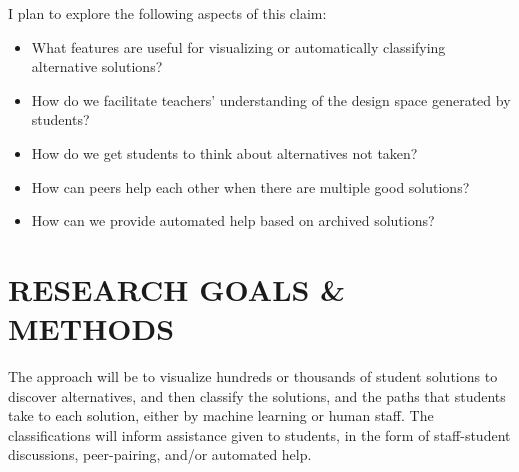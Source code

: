 \documentclass[12pt]{article}
\begin{document}
I plan to explore the following aspects of this claim:
\begin{itemize}

\item What features are useful for visualizing or automatically classifying alternative solutions?

\item How do we facilitate teachers' understanding of the design space generated by students?

\item How do we get students to think about alternatives not taken?

\item How can peers help each other when there are multiple good solutions?

\item How can we provide automated help based on archived solutions?

\end{itemize}


\section{RESEARCH GOALS \& METHODS}

The approach will be to visualize hundreds or thousands of student solutions to discover alternatives, and then classify the solutions, and the paths that students take to each solution, either by machine learning or human staff. The classifications will inform assistance given to students, in the form of staff-student discussions, peer-pairing, and/or automated help.
\end{document}
